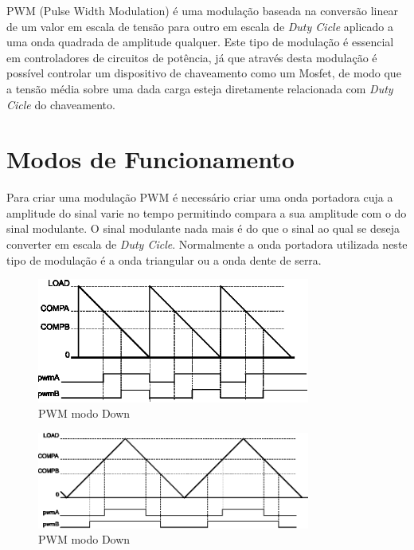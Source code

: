 PWM (Pulse Width Modulation) é uma modulação baseada na conversão linear de um valor em escala de tensão para outro em escala de \emph{Duty Cicle} aplicado a uma onda quadrada de amplitude qualquer. Este tipo de modulação é essencial em controladores de circuitos de potência, já que através desta modulação é possível controlar um dispositivo de chaveamento como um Mosfet,  de modo que a tensão média sobre uma dada carga esteja diretamente relacionada com \emph{Duty Cicle} do chaveamento.  

\section{Modos de Funcionamento}

Para criar uma modulação PWM é necessário criar uma onda portadora cuja a amplitude do sinal varie no tempo permitindo compara a sua amplitude com o do sinal modulante. O sinal modulante nada mais é do que o sinal ao qual se deseja converter em escala de \emph{Duty Cicle}. Normalmente a onda portadora utilizada neste tipo de modulação é a onda triangular ou a onda dente de serra.  

\begin{figure}[H]
	\centering
\includegraphics[width=0.8\textwidth] {figuras/Down.eps}
	\caption{PWM modo Down \cite{DATASHEET_TIVA}}
	\label{fig:Down}
\end{figure}

\begin{figure}[H]
	\centering
	\includegraphics[width=0.8\textwidth] {figuras/UpDown.eps}
	\caption{PWM modo Down \cite{DATASHEET_TIVA}}
	\label{fig:UpDown}
\end{figure}

